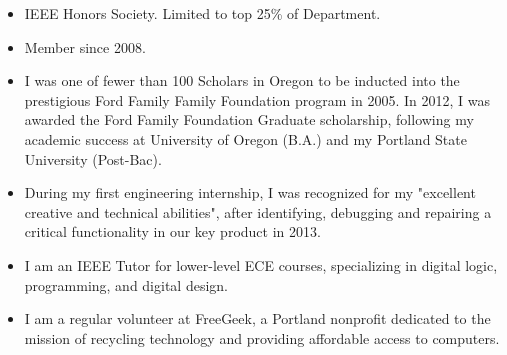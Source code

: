 \documentclass{article}
\begin{document}
	\vspace{-15pt}
	\begin{itemize}
		
		\item {}
		{IEEE Honors Society. Limited to top 25\% of Department.}

		\item {}
		{Member since 2008.}
		\item {}
		{I was one of fewer than 100 Scholars in Oregon to be inducted into the prestigious Ford Family Family Foundation program in 2005.  In 2012, I was awarded the Ford Family Foundation Graduate scholarship, following my academic success at University of Oregon (B.A.) and my Portland State University (Post-Bac).} 
		
		\item {}
		{During my first engineering internship, I was recognized for my "excellent creative and technical abilities", after identifying, debugging and repairing a critical functionality in our key product in 2013.}
	\end{itemize}

\newpage %

\fancyhf{} %

	\vspace{-15pt}
	\begin{itemize}
	
		\item {}
		{I am an IEEE Tutor for lower-level ECE courses, specializing in digital logic, programming, and digital design.}

		\item {}
		{I am a regular volunteer at FreeGeek, a Portland nonprofit dedicated to the mission of recycling technology and providing affordable access to computers.}

	\end{itemize}
	\vspace*{-2pt}
\end{document}
